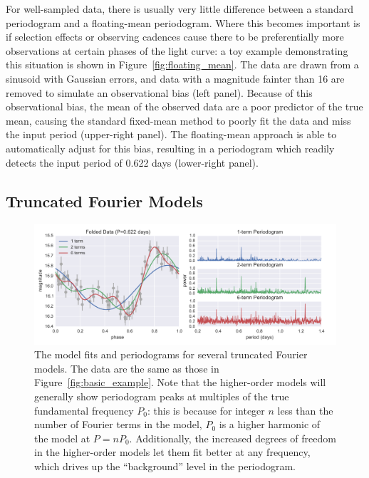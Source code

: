 \documentclass[12pt,preprint]{aastex}
\newcommand{\Fig}[1]{Figure~\ref{fig:#1}}
\newcommand{\fig}[1]{\Fig{#1}}
\newcommand{\figlabel}[1]{\label{fig:#1}}
\newcommand{\sectlabel}[1]{\label{sect:#1}}
\begin{document}
For well-sampled data, there is usually very little difference between a standard periodogram and a floating-mean periodogram. Where this becomes important is if selection effects or observing cadences cause there to be preferentially more observations at certain phases of the light curve: a toy example demonstrating this situation is shown in \fig{floating_mean}. The data are drawn from a sinusoid with Gaussian errors, and data with a magnitude fainter than 16 are removed to simulate an observational bias (left panel). Because of this observational bias, the mean of the observed data are a poor predictor of the true mean, causing the standard fixed-mean method to poorly fit the data and miss the input period (upper-right panel). The floating-mean approach is able to automatically adjust for this bias, resulting in a periodogram which readily detects the input period of 0.622 days (lower-right panel).


\subsection{Truncated Fourier Models}
\sectlabel{multiterm}

\begin{figure}
  \centering
  \includegraphics[width=\textwidth]{fig03.pdf}
  \caption{
    The model fits and periodograms for several truncated Fourier models.
    The data are the same as those in \fig{basic_example}. Note that the
    higher-order models will generally show periodogram peaks at multiples
    of the true fundamental frequency $P_0$: this is because for integer $n$
    less than the number of Fourier terms in the model, $P_0$ is a higher
    harmonic of the model at $P=nP_0$. Additionally, the increased degrees of
    freedom in the higher-order models let them fit better at any frequency,
    which drives up the ``background'' level in the periodogram.
  }
  \figlabel{multiterm_example}
\end{figure}
\end{document}
